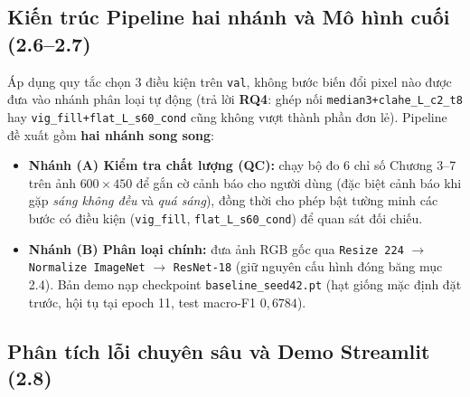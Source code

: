 \documentclass[10pt,twocolumn,a4paper]{article}
\begin{document}
\subsection{Kiến trúc Pipeline hai nhánh và Mô hình cuối (2.6--2.7)}
Áp dụng quy tắc chọn 3 điều kiện trên \texttt{val}, không bước biến đổi pixel nào được đưa vào nhánh phân loại tự động (trả lời \textbf{RQ4}: ghép nối \texttt{median3+clahe\_L\_c2\_t8} hay \texttt{vig\_fill+flat\_L\_s60\_cond} cũng không vượt thành phần đơn lẻ). Pipeline đề xuất gồm \textbf{hai nhánh song song}:
\begin{itemize}
    \item \textbf{Nhánh (A) Kiểm tra chất lượng (QC):} chạy bộ đo 6 chỉ số Chương 3--7 trên ảnh $600{\times}450$ để gắn cờ cảnh báo cho người dùng (đặc biệt cảnh báo khi gặp \emph{sáng không đều} và \emph{quá sáng}), đồng thời cho phép bật tường minh các bước có điều kiện (\texttt{vig\_fill}, \texttt{flat\_L\_s60\_cond}) để quan sát đối chiếu.
    \item \textbf{Nhánh (B) Phân loại chính:} đưa ảnh RGB gốc qua \texttt{Resize 224} $\rightarrow$ \texttt{Normalize ImageNet} $\rightarrow$ \texttt{ResNet-18} (giữ nguyên cấu hình đóng băng mục 2.4). Bản demo nạp checkpoint \texttt{baseline\_seed42.pt} (hạt giống mặc định đặt trước, hội tụ tại epoch 11, test macro-F1 $0{,}6784$).
\end{itemize}

\subsection{Phân tích lỗi chuyên sâu và Demo Streamlit (2.8)}
\begin{table}[t]
\centering
\caption{Hiệu năng theo từng lớp trên tập test ($n=2\,004$, 3 seed) và tỉ lệ ảnh khó bị đoán sai nhất quán ở cả 3 seed.}
\label{tab:perclass}
\end{table}
\end{document}
